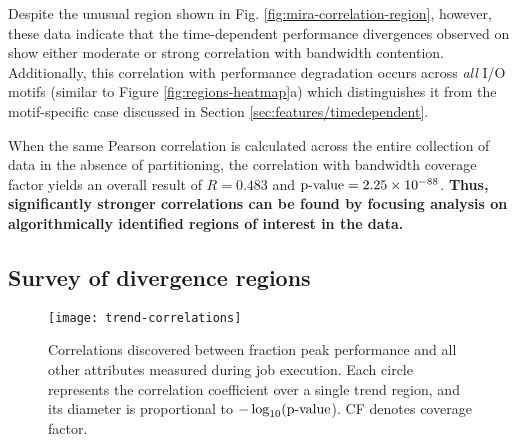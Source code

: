 Despite the unusual region shown in Fig. \ref{fig:mira-correlation-region},
however, these data indicate that the time-dependent performance divergences observed on \mira show either moderate or strong correlation with bandwidth contention.
Additionally, this correlation with performance degradation occurs across
\emph{all} I/O motifs (similar to Figure \ref{fig:regions-heatmap}a) which
distinguishes it from the motif-specific case discussed in Section
\ref{sec:features/timedependent}.  

When the same Pearson correlation is calculated across the entire collection
of \mira \mirafsone data in the absence of partitioning, the correlation with bandwidth coverage factor
yields an overall result of $R = 0.483$ and $\textup{p-value} =
2.25\times 10^{-88}$.  \textbf{Thus, significantly stronger
correlations can be found by focusing analysis on algorithmically identified regions of
interest in the data.}


\subsection{Survey of divergence regions} \label{sec:results/correlate-all}




\begin{figure}
    \centering
    \texttt{[image: trend-correlations]}
    \vspace{-.35in}
    \caption{Correlations discovered between fraction peak performance and all other attributes measured during job execution.
    Each circle represents the correlation coefficient over a single trend region, and its diameter is proportional to $-\log_{10}(\textup{p-value}$).
    CF denotes coverage factor.}
    \label{fig:trend-correlations}
\end{figure}



